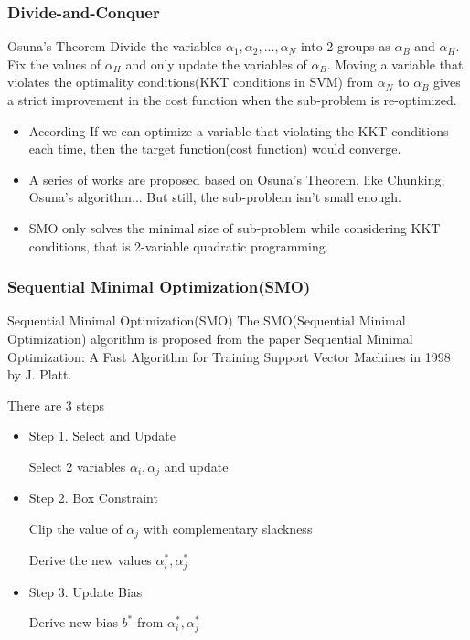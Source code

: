 \documentclass[xcolor=pdftex,dvipsnames,table,handout]{beamer}
\begin{document}
\begin{frame}  
\frametitle{Divide-and-Conquer}
\begin{block}{Osuna's Theorem}
Divide the variables $\alpha_1, \alpha_2, ..., \alpha_N$ into 2 groups as $\alpha_B$ and $\alpha_H$. Fix the values of $\alpha_H$ and only update the variables of $\alpha_B$. Moving a variable that violates the optimality conditions(KKT conditions in SVM) from $\alpha_N$ to $\alpha_B$ gives a strict improvement in the cost function 
when the sub-problem is re-optimized.
\end{block}
\begin{itemize}[<+->]
\item According If we can optimize a variable that violating the KKT conditions each time, then the target function(cost function) would converge.

\item A series of works are proposed based on Osuna's Theorem, like Chunking, Osuna's algorithm... But still, the sub-problem isn't small enough.

\item SMO only solves the minimal size of sub-problem while considering KKT conditions, that is 2-variable quadratic programming.
\end{itemize}
\end{frame}

\begin{frame}  
\frametitle{Sequential Minimal Optimization(SMO)}
\begin{block}{Sequential Minimal Optimization(SMO)}
The SMO(Sequential Minimal Optimization) algorithm is proposed from the paper Sequential Minimal Optimization: A Fast Algorithm for Training Support Vector Machines in 1998 by J. Platt.
\end{block}

There are 3 steps

\begin{itemize}[<+->]
\item Step 1. Select and Update

Select 2 variables $\alpha_i, \alpha_j$ and update

\item Step 2. Box Constraint

Clip the value of $\alpha_j$ with complementary slackness

Derive the new values $\alpha_i^*, \alpha_j^*$

\item Step 3. Update Bias

Derive new bias $b^*$ from $\alpha_i^*, \alpha_j^*$
\end{itemize}
\end{frame}
\end{document}
